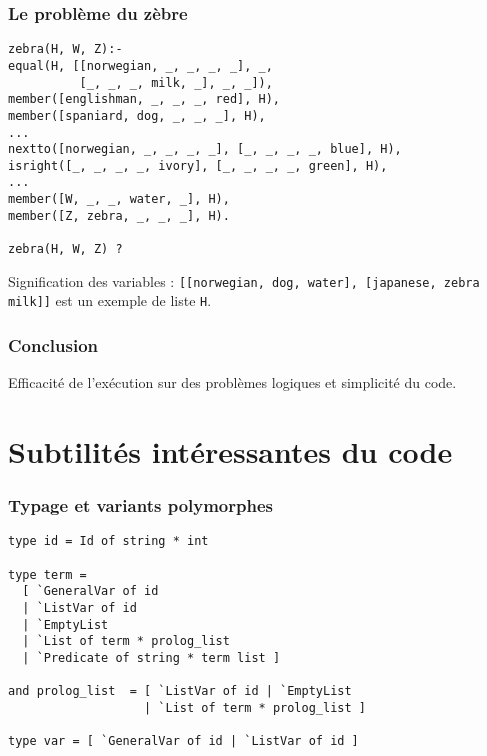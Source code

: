 \documentclass[aspectratio=43]{beamer}
\begin{document}
\begin{frame}[fragile]
  \frametitle{Le problème du zèbre}
  \begin{verbatim}
zebra(H, W, Z):-
equal(H, [[norwegian, _, _, _, _], _,
          [_, _, _, milk, _], _, _]),
member([englishman, _, _, _, red], H),
member([spaniard, dog, _, _, _], H),
...
nextto([norwegian, _, _, _, _], [_, _, _, _, blue], H),
isright([_, _, _, _, ivory], [_, _, _, _, green], H),
...
member([W, _, _, water, _], H),
member([Z, zebra, _, _, _], H).

zebra(H, W, Z) ?
  \end{verbatim}

  \begin{exampleblock}{Signification des variables :}
    \texttt{[[norwegian, dog, water], [japanese, zebra milk]]} est un exemple de liste \texttt{H}.
  \end{exampleblock}
  
\end{frame}

\begin{frame}[plain]
  \frametitle{Conclusion}
  Efficacité de l'exécution sur des problèmes logiques et simplicité du code.
  \tableofcontents
\end{frame}

\section{Subtilités intéressantes du code}

\begin{frame}[fragile]
  \frametitle{Typage et variants polymorphes}
  \begin{verbatim}
type id = Id of string * int

type term =
  [ `GeneralVar of id
  | `ListVar of id
  | `EmptyList
  | `List of term * prolog_list
  | `Predicate of string * term list ]

and prolog_list  = [ `ListVar of id | `EmptyList
                   | `List of term * prolog_list ]

type var = [ `GeneralVar of id | `ListVar of id ]
  \end{verbatim}
\end{frame}
\end{document}
